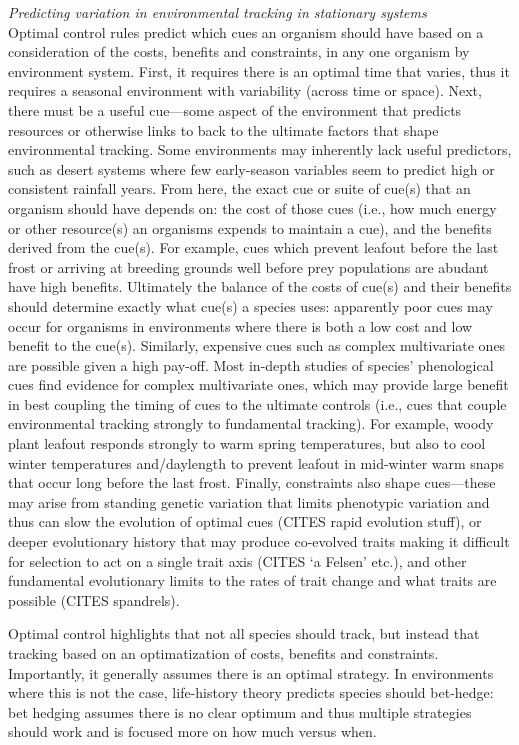 \documentclass[11pt,letterpaper]{article}
\begin{document}
\emph{Predicting variation in environmental tracking in stationary systems}\\
Optimal control rules predict which cues an organism should have based on a consideration of the costs, benefits and constraints, in any one organism by environment system. First, it requires there is an optimal time that varies, thus it requires a seasonal environment with variability (across time or space). Next, there must be a useful cue---some aspect of the environment that predicts resources or otherwise links to back to the ultimate factors that shape environmental tracking. Some environments may inherently lack useful predictors, such as desert systems where few early-season variables seem to predict high or consistent rainfall years. From here, the exact cue or suite of cue(s) that an organism should have depends on: the cost of those cues (i.e., how much energy or other resource(s) an organisms expends to maintain a cue), and the benefits derived from the cue(s). For example, cues which prevent leafout before the last frost or arriving at breeding grounds well before prey populations are abudant have high benefits. Ultimately the balance of the costs of cue(s) and their benefits should determine exactly what cue(s) a species uses: apparently poor cues may occur for organisms in environments where there is both a low cost and low benefit to the cue(s). Similarly, expensive cues such as complex multivariate ones are possible given a high pay-off. Most in-depth studies of species' phenological cues find evidence for complex multivariate ones, which may provide large benefit in best coupling the timing of cues to the ultimate controls (i.e., cues that couple environmental tracking strongly to fundamental tracking). For example, woody plant leafout responds strongly to warm spring temperatures, but also to cool winter temperatures and/daylength to prevent leafout in mid-winter warm snaps that occur long before the last frost. Finally, constraints also shape cues---these may arise from standing genetic variation that limits phenotypic variation and thus can slow the evolution of optimal cues (CITES rapid evolution stuff), or deeper evolutionary history that may produce co-evolved traits making it difficult for selection to act on a single trait axis (CITES `a Felsen' etc.), and other fundamental evolutionary limits to the rates of trait change and what traits are possible (CITES spandrels). 

Optimal control highlights that not all species should track, but instead that tracking based on an optimatization of costs, benefits and constraints. Importantly, it generally assumes there is an optimal strategy. In environments where this is not the case, life-history theory predicts species should bet-hedge: bet hedging assumes there is no clear optimum and thus multiple strategies should work and is focused more on how much versus when.
\end{document}
